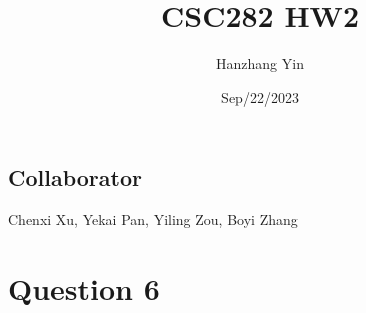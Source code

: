\documentclass{article}
\title{CSC282 HW2}
\author{Hanzhang Yin}
\date{Sep/22/2023}
\begin{document}
\maketitle

\subsection*{Collaborator}
Chenxi Xu, Yekai Pan, Yiling Zou, Boyi Zhang

\section*{Question 6}

\begin{comment}
# Helper Function
function CCW(p1, p2, p3):
    #True if counter-clockwise turn
    return (p2.x - p1.x) * (p3.y - p1.y) - (p2.y - p1.y) * (p3.x - p1.x) > 0  

function sortPointsLexicographically(points):
    # Sort the points by x-coordinate, breaking ties with y-coordinate
    # Time-complexity O(n log n)
    return sorted(points, key: (point.x, point.y))

# Main Function (Andrew's Algorithm)
function constructSimplePolygon(points):
    # Sort points lexicographically
    sortedPoints = sortPointsLexicographically(points)

    # Build the upper chain
    upperChain = []
    for point in sortedPoints:
        upperChain.append(point)
        while len(upperChain) >= 3 and not CCW_left(upperChain[len(upperChain) - 3],
                                                    upperChain[len(upperChain) - 2],
                                                    upperChain[len(upperChain) - 1]):
            # Remove the middle point to maintain the CCW property
            upperChain.pop(len(upperChain) - 2)

    # Build the lower chain
    lowerChain = []
    for point in reverse(sortedPoints):
        lowerChain.append(point)
        while len(lowerChain) >= 3 and not CCW_left(lowerChain[len(lowerChain) - 3],
                                                    lowerChain[len(lowerChain) - 2],
                                                    lowerChain[len(lowerChain) - 1]):
            # Remove the middle point to maintain the CCW property
            lowerChain.pop(len(lowerChain) - 2)

    # Combine the chains to form the simple polygon
    upperChain.pop(len(upperChain) - 1)
    lowerChain.pop(len(lowerChain) - 1)
    polygon = upperChain + lowerChain

    # Return the polygon containing all points
    return polygon
\end{comment}
\end{document}
